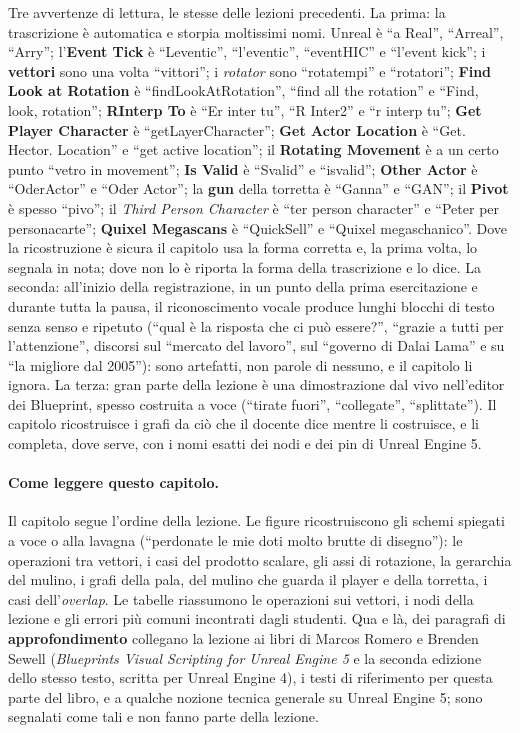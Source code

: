 Tre avvertenze di lettura, le stesse delle lezioni precedenti. La prima: la
trascrizione è automatica e storpia moltissimi nomi. Unreal è ``a Real'', ``Arreal'',
``Arry''; l'\textbf{Event Tick} è ``Leventic'', ``l'eventic'', ``eventHIC'' e
``l'event kick''; i \textbf{vettori} sono una volta ``vittori''; i \emph{rotator} sono
``rotatempi'' e ``rotatori''; \textbf{Find Look at Rotation} è ``findLookAtRotation'',
``find all the rotation'' e ``Find, look, rotation''; \textbf{RInterp To} è ``Er inter
tu'', ``R Inter2'' e ``r interp tu''; \textbf{Get Player Character} è
``getLayerCharacter''; \textbf{Get Actor Location} è ``Get. Hector. Location'' e ``get
active location''; il \textbf{Rotating Movement} è a un certo punto ``vetro in
movement''; \textbf{Is Valid} è ``Svalid'' e ``isvalid''; \textbf{Other Actor} è
``OderActor'' e ``Oder Actor''; la \textbf{gun} della torretta è ``Ganna'' e ``GAN'';
il \textbf{Pivot} è spesso ``pivo''; il \emph{Third Person Character} è ``ter person
character'' e ``Peter per personacarte''; \textbf{Quixel Megascans} è ``QuickSell'' e
``Quixel megaschanico''. Dove la ricostruzione è sicura il capitolo usa la forma
corretta e, la prima volta, lo segnala in nota; dove non lo è riporta la forma della
trascrizione e lo dice. La seconda: all'inizio della registrazione, in un punto della
prima esercitazione e durante tutta la pausa, il riconoscimento vocale produce lunghi
blocchi di testo senza senso e ripetuto (``qual è la risposta che ci può essere?'',
``grazie a tutti per l'attenzione'', discorsi sul ``mercato del lavoro'', sul ``governo
di Dalai Lama'' e su ``la migliore dal 2005''): sono artefatti, non parole di nessuno,
e il capitolo li ignora. La terza: gran parte della lezione è una dimostrazione dal
vivo nell'editor dei Blueprint, spesso costruita a voce (``tirate fuori'',
``collegate'', ``splittate''). Il capitolo ricostruisce i grafi da ciò che il docente
dice mentre li costruisce, e li completa, dove serve, con i nomi esatti dei nodi e dei
pin di Unreal Engine 5.

\paragraph{Come leggere questo capitolo.} Il capitolo segue l'ordine della lezione.
Le figure ricostruiscono gli schemi spiegati a voce o alla lavagna (``perdonate le mie
doti molto brutte di disegno''): le operazioni tra vettori, i casi del prodotto
scalare, gli assi di rotazione, la gerarchia del mulino, i grafi della pala, del
mulino che guarda il player e della torretta, i casi dell'\emph{overlap}. Le tabelle
riassumono le operazioni sui vettori, i nodi della lezione e gli errori più comuni
incontrati dagli studenti. Qua e là, dei paragrafi di \textbf{approfondimento}
collegano la lezione ai libri di Marcos Romero e Brenden Sewell (\emph{Blueprints
Visual Scripting for Unreal Engine 5} e la seconda edizione dello stesso testo, scritta
per Unreal Engine 4), i testi di riferimento per questa parte del libro, e a qualche
nozione tecnica generale su Unreal Engine 5; sono segnalati come tali e non fanno parte
della lezione.

